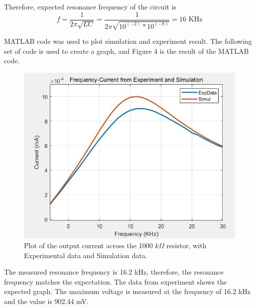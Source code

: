 \documentclass[12pt]{article}
\begin{document}
Therefore, expected resonance frequency of the circuit is
\begin{equation}
    f = \frac{1}{2\pi \sqrt{LC}} =\frac{1}{2\pi \sqrt{10^(-2)*10^(-8)}} = 16   \text{ KHz}
\end{equation}

MATLAB code was used to plot simulation and experiment result. The following set of code is used to create a graph, and Figure 4 is the result of the MATLAB code.


\begin{figure}[htp]
    \centering
    \includegraphics[width= 15cm]{lessErrorRLCsimul.JPG}
    \caption{Plot of the output current across the 1000 $k\Omega$ resistor, with Experimental data and Simulation data.}
    \label{fig:galaxy}
\end{figure}

The measured resonance frequency is 16.2 kHz, therefore, the resonance frequency matches the expectation.
The data from experiment shows the expected graph. The maximum voltage is measured at the frequency of 16.2 kHz and the value is 902.44 mV.
\end{document}
